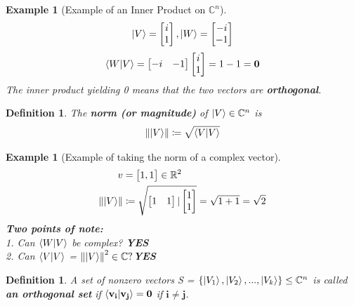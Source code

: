 \documentclass[12pt]{article}
\theoremstyle{plain}
\theoremstyle{nonumberplain}
\theoremstyle{plain}
\newtheorem{definition}[lemma]{Definition}
\newtheorem{example}[lemma]{Example}
\theoremstyle{nonumberplain}
\newcommand\1{{\bf 1}}
\newcommand{\bmat}[1]{\begin{bmatrix*} #1 \end{bmatrix*}} %
\newcommand{\R}{\mathbb{R}} %
\newcommand{\C}{\mathbb{C}} %
\newcommand{\<}{\left\langle}
\renewcommand{\>}{\right\rangle}
\newcommand{\norm}[1]{\left\lVert#1\right\rVert} %
\begin{document}
\begin{example}[Example of an Inner Product on $\C^n$]
\begin{equation}
\ket{V} = \bmat{i\\ 1}, \ket{W} = \bmat{-i\\ -1}
\end{equation}
\begin{equation}
\braket{W|V} = \bmat{-i& -1}\bmat{i\\ 1} = 1 - 1 = \mathbf{0} 
\end{equation}
\textit{The inner product yielding 0 means that the two vectors are \textbf{orthogonal}.}
\end{example}

\pagebreak
\begin{definition}
The \textbf{norm (or magnitude)} of $\ket{V} \in \C^n$ is 
\begin{equation}
\norm{\ket{V}} \coloneqq \sqrt{\braket{V|V}}
\end{equation}
\end{definition}

\begin{example} [Example of taking the norm of a complex vector]
\begin{equation*}
\begin{split}
v &= \bmat{1,1} \in \R^2\\
\norm{\ket{V}} &\coloneqq \sqrt{\bmat{1 & 1}|\bmat{1\\ 1}} = \sqrt{1+1} = \sqrt{2}
\end{split}
\end{equation*}
\textbf{Two points of note:}\\
1. Can $\braket{W|V}$ be complex?\qquad\qquad\;         \textbf{YES}\\
2. Can $\braket{V|V}$ = $\norm{\ket{V}}^2 \in \C?$\qquad\qquad   \textbf{YES}
\end{example}

\begin{definition}
A set of nonzero vectors S = $\{\ket{V_1}, \ket{V_2}, ... , \ket{V_k}\} \leq \C^n$ is called \textbf{an orthogonal set} if $\mathbf{\braket{v_i|v_j} = 0}$ if $\mathbf{i \neq j}$.
\end{definition}
\end{document}
